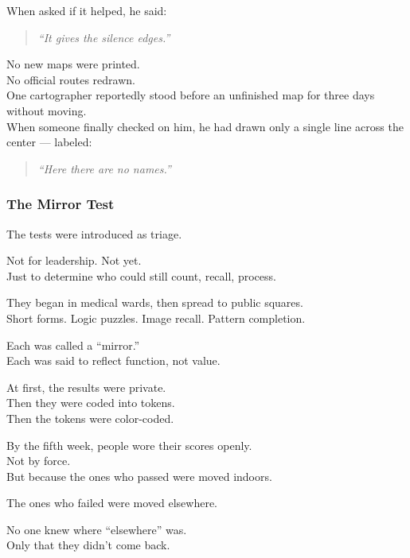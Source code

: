 \documentclass[12pt]{article}
\begin{document}
When asked if it helped, he said:

\begin{quote}
\textit{“It gives the silence edges.”}
\end{quote}

\vspace{1em}

No new maps were printed.\\
No official routes redrawn.\\
One cartographer reportedly stood before an unfinished map for three days without moving.\\
When someone finally checked on him, he had drawn only a single line across the center — labeled:

\begin{quote}
\textit{“Here there are no names.”}
\end{quote}

\dotfill

\subsubsection*{The Mirror Test}

The tests were introduced as triage.

Not for leadership. Not yet.\\
Just to determine who could still count, recall, process.

They began in medical wards, then spread to public squares.\\
Short forms. Logic puzzles. Image recall. Pattern completion.

Each was called a “mirror.”\\
Each was said to reflect function, not value.

\vspace{1em}

At first, the results were private.\\
Then they were coded into tokens.\\
Then the tokens were color-coded.

By the fifth week, people wore their scores openly.\\
Not by force.\\
But because the ones who passed were moved indoors.

The ones who failed were moved elsewhere.

\vspace{1em}

No one knew where “elsewhere” was.\\
Only that they didn’t come back.
\end{document}
